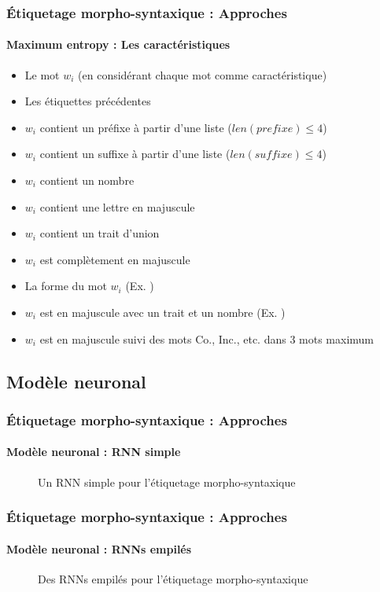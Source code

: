 \documentclass[xcolor=table]{beamer}
\begin{document}
\begin{frame}
\frametitle{Étiquetage morpho-syntaxique : Approches}
\framesubtitle{Maximum entropy : Les caractéristiques}

\begin{itemize}
	\item Le mot $w_i$ (en considérant chaque mot comme caractéristique)
	\item Les étiquettes précédentes 
	\item $w_i$ contient un préfixe à partir d'une liste ($len(prefixe) \le 4$) 
	\item $w_i$ contient un suffixe à partir d'une liste ($len(suffixe) \le 4$) 
	\item $w_i$ contient un nombre 
	\item $w_i$ contient une lettre en majuscule
	\item $w_i$ contient un trait d'union 
	\item $w_i$ est complètement en majuscule
	\item La forme du mot $w_i$ (Ex. ) 
	\item $w_i$ est en majuscule avec un trait et un nombre (Ex. ) 
	\item $w_i$ est en majuscule suivi des mots Co., Inc., etc. dans 3 mots maximum
\end{itemize}

\end{frame}

\subsection{Modèle neuronal}

\begin{frame}
\frametitle{Étiquetage morpho-syntaxique : Approches}
\framesubtitle{Modèle neuronal : RNN simple}

\begin{figure}
	\centering
	\caption{Un RNN simple pour l'étiquetage morpho-syntaxique \cite{2019-jurafsky-martin}}
\end{figure}

\end{frame}

\begin{frame}
\frametitle{Étiquetage morpho-syntaxique : Approches}
\framesubtitle{Modèle neuronal : RNNs empilés}

\begin{figure}
	\centering
	\caption{Des RNNs empilés pour l'étiquetage morpho-syntaxique \cite{2019-jurafsky-martin}}
\end{figure}

\end{frame}
\end{document}
